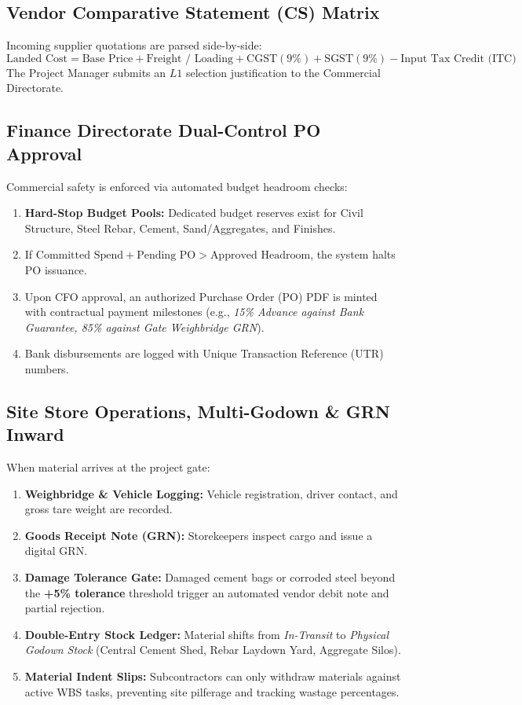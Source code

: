 \documentclass[11pt,a4paper]{article}
\begin{document}
\subsection{Vendor Comparative Statement (CS) Matrix}
Incoming supplier quotations are parsed side-by-side:
\begin{equation}
    \text{Landed Cost} = \text{Base Price} + \text{Freight / Loading} + \text{CGST} (9\%) + \text{SGST} (9\%) - \text{Input Tax Credit (ITC)}
\end{equation}
The Project Manager submits an $L1$ selection justification to the Commercial Directorate.

\subsection{Finance Directorate Dual-Control PO Approval}
Commercial safety is enforced via automated budget headroom checks:
\begin{enumerate}[noitemsep]
    \item \textbf{Hard-Stop Budget Pools:} Dedicated budget reserves exist for Civil Structure, Steel Rebar, Cement, Sand/Aggregates, and Finishes.
    \item If $\text{Committed Spend} + \text{Pending PO} > \text{Approved Headroom}$, the system halts PO issuance.
    \item Upon CFO approval, an authorized Purchase Order (PO) PDF is minted with contractual payment milestones (e.g., \textit{15\% Advance against Bank Guarantee, 85\% against Gate Weighbridge GRN}).
    \item Bank disbursements are logged with Unique Transaction Reference (UTR) numbers.
\end{enumerate}

\subsection{Site Store Operations, Multi-Godown \& GRN Inward}
When material arrives at the project gate:
\begin{enumerate}[noitemsep]
    \item \textbf{Weighbridge \& Vehicle Logging:} Vehicle registration, driver contact, and gross tare weight are recorded.
    \item \textbf{Goods Receipt Note (GRN):} Storekeepers inspect cargo and issue a digital GRN.
    \item \textbf{Damage Tolerance Gate:} Damaged cement bags or corroded steel beyond the \textbf{+5\% tolerance} threshold trigger an automated vendor debit note and partial rejection.
    \item \textbf{Double-Entry Stock Ledger:} Material shifts from \textit{In-Transit} to \textit{Physical Godown Stock} (Central Cement Shed, Rebar Laydown Yard, Aggregate Silos).
    \item \textbf{Material Indent Slips:} Subcontractors can only withdraw materials against active WBS tasks, preventing site pilferage and tracking wastage percentages.
\end{enumerate}
\end{document}
